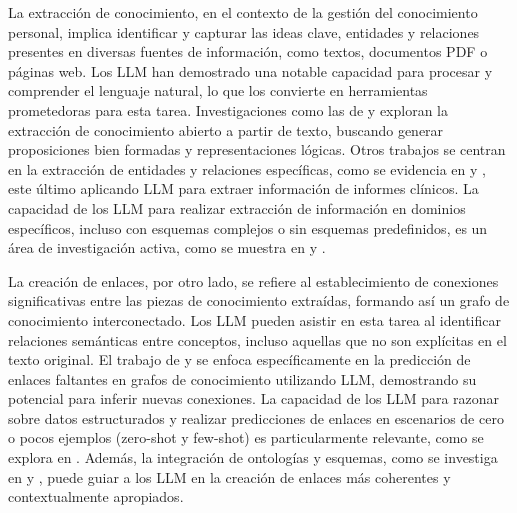 La extracción de conocimiento, en el contexto de la gestión del conocimiento personal, implica identificar y capturar las ideas clave, entidades y relaciones presentes en diversas fuentes de información, como textos, documentos PDF o páginas web. Los LLM han demostrado una notable capacidad para procesar y comprender el lenguaje natural, lo que los convierte en herramientas prometedoras para esta tarea. Investigaciones como las de \parencite{vandurmeOpenKnowledgeExtraction2008} y \parencite{mccuskerLOKELinkedOpen2023} exploran la extracción de conocimiento abierto a partir de texto, buscando generar proposiciones bien formadas y representaciones lógicas. Otros trabajos se centran en la extracción de entidades y relaciones específicas, como se evidencia en \parencite{martinez-rodriguezMiningInformationSentences2022} y \parencite{liAutomatedClinicalData2024}, este último aplicando LLM para extraer información de informes clínicos. La capacidad de los LLM para realizar extracción de información en dominios específicos, incluso con esquemas complejos o sin esquemas predefinidos, es un área de investigación activa, como se muestra en \parencite{liKnowCoderCodingStructured2024} y \parencite{zhangExtractDefineCanonicalize2024}.

La creación de enlaces, por otro lado, se refiere al establecimiento de conexiones significativas entre las piezas de conocimiento extraídas, formando así un grafo de conocimiento interconectado. Los LLM pueden asistir en esta tarea al identificar relaciones semánticas entre conceptos, incluso aquellas que no son explícitas en el texto original. El trabajo de \parencite{shuKnowledgeGraphLarge2024} y \parencite{heLinkGPTTeachingLarge2024} se enfoca específicamente en la predicción de enlaces faltantes en grafos de conocimiento utilizando LLM, demostrando su potencial para inferir nuevas conexiones. La capacidad de los LLM para razonar sobre datos estructurados y realizar predicciones de enlaces en escenarios de cero o pocos ejemplos (zero-shot y few-shot) es particularmente relevante, como se explora en \parencite{cartaIterativeZeroShotLLM2023}. Además, la integración de ontologías y esquemas, como se investiga en \parencite{fengOntologygroundedAutomaticKnowledge2024} y \parencite{luoOneKEDockerizedSchemaGuided2025}, puede guiar a los LLM en la creación de enlaces más coherentes y contextualmente apropiados.


